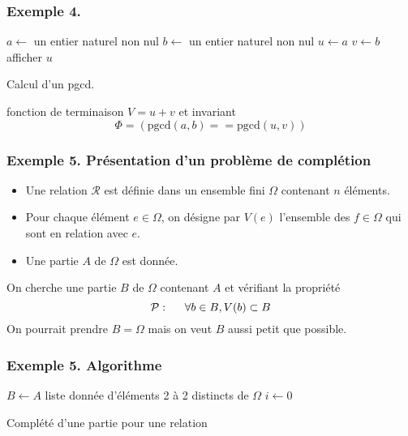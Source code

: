 \begin{frame}
  \frametitle{Exemple 4.}
\begin{algorithm}[H]
  $a\longleftarrow$ un entier naturel non nul\;
  $b\longleftarrow$ un entier naturel non nul\;
  $u\longleftarrow a$\;
  $v\longleftarrow b$\;
  afficher $u$\;
  \caption{Calcul d'un pgcd.}
\end{algorithm}
fonction de terminaison $V = u + v$ et invariant 
\begin{displaymath}
 \Phi = \left( \text{pgcd}(a,b) == \text{pgcd}(u,v)\right) 
\end{displaymath}
\end{frame}

\begin{frame}
  \frametitle{Exemple 5. Présentation d'un problème de \og complétion\fg~}
\begin{itemize}
  \item Une relation $\mathcal{R}$ est définie dans un ensemble fini $\Omega$ contenant $n$ éléments.
  \item Pour chaque élément $e\in \Omega$, on désigne par $V(e)$ l'ensemble des $f\in \Omega$ qui sont en relation avec $e$.
  \item Une partie $A$ de $\Omega$ est donnée.
\end{itemize}
 On cherche une partie $B$ de $\Omega$ contenant $A$ et vérifiant la propriété
\begin{displaymath}
  \mathcal{P}: \hspace{0.5cm} \forall b \in B, V(b) \subset B
\end{displaymath}
On pourrait prendre $B=\Omega$ mais on veut $B$ aussi petit que possible.
\end{frame}

\begin{frame}
  \frametitle{Exemple 5. Algorithme}
\begin{algorithm}[H]
  $B \leftarrow A$ liste donnée d'éléments 2 à 2 distincts de $\Omega$\;
  $i \leftarrow 0$\;
  \caption{Complété d'une partie pour une relation}
\end{algorithm}
\end{frame}


